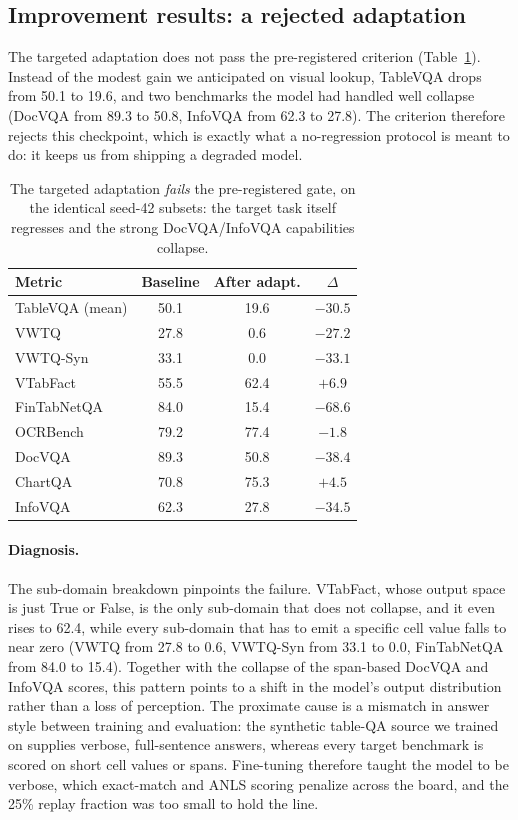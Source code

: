 \documentclass{article}
\begin{document}
\subsection{Improvement results: a rejected adaptation}
\label{sec:improve-results}
The targeted adaptation does not pass the pre-registered criterion
(Table~\ref{tab:improve}). Instead of the modest gain we anticipated on visual
lookup, TableVQA drops from 50.1 to 19.6, and two benchmarks the model had
handled well collapse (DocVQA from 89.3 to 50.8, InfoVQA from 62.3 to 27.8). The
criterion therefore rejects this checkpoint, which is exactly what a
no-regression protocol is meant to do: it keeps us from shipping a degraded
model.

\begin{table}[t]
\caption{The targeted adaptation \emph{fails} the pre-registered gate, on the
identical seed-42 subsets: the target task itself regresses and the strong
DocVQA/InfoVQA capabilities collapse.}
\label{tab:improve}
\centering
\small
\begin{tabular}{@{}lccc@{}}
\toprule
Metric & Baseline & After adapt. & $\Delta$ \\
\midrule
TableVQA (mean)      & 50.1 & 19.6 & $-30.5$ \\
\quad VWTQ            & 27.8 & 0.6  & $-27.2$ \\
\quad VWTQ-Syn        & 33.1 & 0.0  & $-33.1$ \\
\quad VTabFact        & 55.5 & 62.4 & $+6.9$ \\
\quad FinTabNetQA     & 84.0 & 15.4 & $-68.6$ \\
\midrule
OCRBench  & 79.2 & 77.4 & $-1.8$ \\
DocVQA    & 89.3 & 50.8 & $-38.4$ \\
ChartQA   & 70.8 & 75.3 & $+4.5$ \\
InfoVQA   & 62.3 & 27.8 & $-34.5$ \\
\bottomrule
\end{tabular}
\end{table}

\paragraph{Diagnosis.}
The sub-domain breakdown pinpoints the failure. VTabFact, whose output space is
just True or False, is the only sub-domain that does not collapse, and it even
rises to 62.4, while every sub-domain that has to emit a specific cell value
falls to near zero (VWTQ from 27.8 to 0.6, VWTQ-Syn from 33.1 to 0.0, FinTabNetQA
from 84.0 to 15.4). Together with the collapse of the span-based DocVQA and
InfoVQA scores, this pattern points to a shift in the model's output distribution
rather than a loss of perception. The proximate cause is a mismatch in answer
style between training and evaluation: the synthetic table-QA source we trained on
supplies verbose, full-sentence answers, whereas every target benchmark is scored
on short cell values or spans. Fine-tuning therefore taught the model to be
verbose, which exact-match and ANLS scoring penalize across the board, and the
25\% replay fraction was too small to hold the line.
\end{document}
